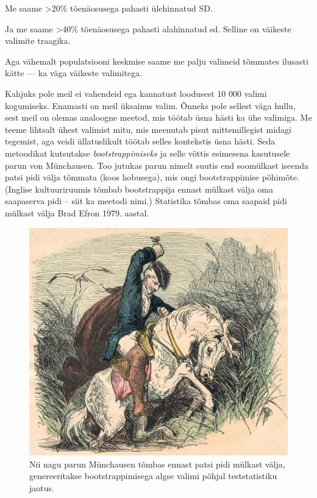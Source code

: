 \documentclass[]{book}
\newenvironment{Shaded}{\begin{snugshade}}{\end{snugshade}}
\newcommand{\CommentTok}[1]{\textcolor[rgb]{0.56,0.35,0.01}{\textit{#1}}}
\newcommand{\DecValTok}[1]{\textcolor[rgb]{0.00,0.00,0.81}{#1}}
\newcommand{\KeywordTok}[1]{\textcolor[rgb]{0.13,0.29,0.53}{\textbf{#1}}}
\newcommand{\NormalTok}[1]{#1}
\newcommand{\OperatorTok}[1]{\textcolor[rgb]{0.81,0.36,0.00}{\textbf{#1}}}
\newcommand{\StringTok}[1]{\textcolor[rgb]{0.31,0.60,0.02}{#1}}
\begin{document}
Me saame \textgreater{}20\% tõenäosusega pahasti ülehinnatud SD.

\begin{Shaded}
\end{Shaded}

Ja me saame \textgreater{}40\% tõenäosusega pahasti alahinnatud sd.
Selline on väikeste valimite traagika.

Aga vähemalt populatsiooni keskmise saame me palju valimeid tõmmates ilusasti kätte --- ka väga väikeste valimitega.

Kahjuks pole meil ei vahendeid ega kannatust loodusest 10 000 valimi kogumiseks.
Enamasti on meil üksainus valim.
Õnneks pole sellest väga hullu, sest meil on olemas analoogne meetod, mis töötab üsna hästi ka ühe valimiga. Me teeme lihtsalt ühest valimist mitu, mis meenutab pisut mittemillegist midagi tegemist, aga veidi üllatuslikult töötab selles kontekstis üsna hästi.
Seda metoodikat kutsutakse \emph{bootstrappimiseks} ja selle võttis esimesena kasutusele parun von Münchausen.
Too jutukas parun nimelt suutis end soomülkast iseenda patsi pidi välja tõmmata (koos hobusega), mis ongi bootstrappimise põhimõte. (Inglise kultuuriruumis tõmbab bootstrappija ennast mülkast välja oma saapaserva pidi -- siit ka meetodi nimi.)
Statistika tõmbas oma saapaid pidi mülkast välja Brad Efron 1979. aastal.



\begin{figure}
\includegraphics[width=0.5\linewidth]{img/munchausen} \caption{Nii nagu parun Münchausen tõmbas ennast patsi pidi mülkast välja, genereeritakse bootstrappimisega algse valimi põhjal teststatistiku jaotus.}\label{fig:parun}
\end{figure}
\end{document}
